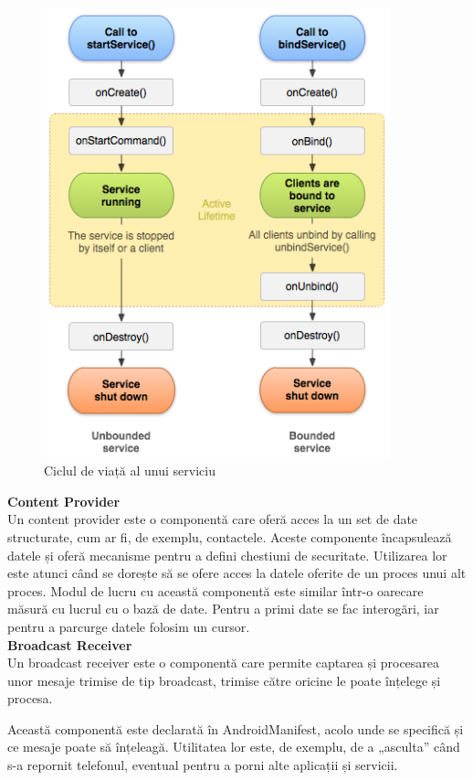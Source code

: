 \documentclass[12pt,a4paper]{article}
\begin{document}
\begin{figure}[h]
\centering
\includegraphics[width=10cm]{figures/service_lifecycle.png}
\caption{Ciclul de viață al unui serviciu}
\label{fig:service_lifecycle}
\end{figure}

\textbf{Content Provider}\\
Un content provider este o componentă care oferă acces la un set de date structurate, cum ar fi, de exemplu, contactele. Aceste componente încapsulează datele și oferă mecanisme pentru a defini chestiuni de securitate. Utilizarea lor este atunci când se dorește să se ofere acces la datele oferite de un proces unui alt proces.
Modul de lucru cu această componentă este similar într-o oarecare măsură cu lucrul cu o bază de date. Pentru a primi date se fac interogări, iar pentru a parcurge datele folosim un cursor.\\

\textbf{Broadcast Receiver}\\
Un broadcast receiver este o componentă care permite captarea și procesarea unor mesaje trimise de tip broadcast, trimise către oricine le poate înțelege și procesa.

Această componentă este declarată în AndroidManifest, acolo unde se specifică și ce mesaje poate să înțeleagă. Utilitatea lor este, de exemplu, de a „asculta” când s-a repornit telefonul, eventual pentru a porni alte aplicații și servicii.
\end{document}

